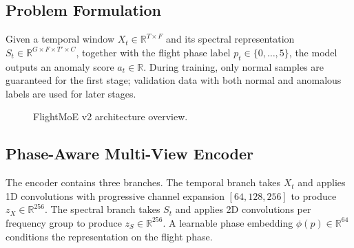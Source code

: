 \documentclass[letterpaper]{article}
\begin{document}
\subsection{Problem Formulation}
Given a temporal window \(X_t \in \mathbb{R}^{T \times F}\) and its spectral representation \(S_t \in \mathbb{R}^{G \times F \times T' \times C}\), together with the flight phase label \(p_t \in \{0,\dots,5\}\), the model outputs an anomaly score \(a_t \in \mathbb{R}\). During training, only normal samples are guaranteed for the first stage; validation data with both normal and anomalous labels are used for later stages.

\begin{figure}[htbp]
\centering
{}
\caption{FlightMoE v2 architecture overview.}
\label{fig:arch}
\end{figure}

\subsection{Phase-Aware Multi-View Encoder}
The encoder contains three branches. The temporal branch takes \(X_t\) and applies 1D convolutions with progressive channel expansion \([64, 128, 256]\) to produce \(z_X \in \mathbb{R}^{256}\). The spectral branch takes \(S_t\) and applies 2D convolutions per frequency group to produce \(z_S \in \mathbb{R}^{256}\). A learnable phase embedding \(\phi(p) \in \mathbb{R}^{64}\) conditions the representation on the flight phase.
\end{document}
